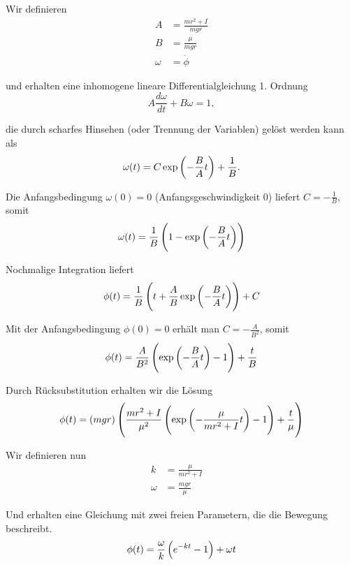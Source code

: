 \documentclass[a4paper,german,12pt,smallheadings]{scrartcl}
\begin{document}
Wir definieren
\begin{align}
  A &= \frac{mr^2+I}{mgr} \\
  B &= \frac{\mu}{mgr} \\
  \omega &= \dot{\phi}
\end{align}

und erhalten eine inhomogene lineare Differentialgleichung 1. Ordnung
\begin{equation}
  A \frac{d \omega}{dt} + B \omega = 1,
\end{equation}

die durch scharfes Hinsehen (oder Trennung der Variablen) gelöst werden kann als
\begin{equation}
  \omega(t) = C \exp\del{- \frac{B}{A} t} + \frac{1}{B}.
\end{equation}

Die Anfangsbedingung $\omega(0) = 0$ (Anfangsgeschwindigkeit 0) liefert $C =
-\frac{1}{B}$, somit
\begin{equation}
  \omega(t) = \frac{1}{B} \del{1 - \exp\del{-\frac{B}{A} t}}
\end{equation}

Nochmalige Integration liefert
\begin{equation}
  \phi(t) = \frac{1}{B} \del{t + \frac{A}{B} \exp\del{-\frac{B}{A} t}} + C
\end{equation}

Mit der Anfangsbedingung $\phi(0) = 0$ erhält man $C = -\frac{A}{B^2}$, somit
\begin{equation}
  \phi(t) = \frac{A}{B^2} \del{ \exp\del{-\frac{B}{A} t} - 1} + \frac{t}{B}
\end{equation}

Durch Rücksubstitution erhalten wir die Lösung
\begin{equation}
  \phi(t)
  = \del{mgr}
  \del{
    \frac{mr^2+I}{\mu^2}
    \del{
      \exp\del{-\frac{\mu}{mr^2 + I} t} - 1
  } + \frac{t}{\mu}}
\end{equation}

Wir definieren nun
\begin{align}
  k &= \frac{\mu}{mr^2 + I} \quad
  \label{eq:k} \\
  \omega &= \frac{mgr}{\mu}
  \label{eq:omega}
\end{align}

Und erhalten eine Gleichung mit zwei freien Parametern, die die Bewegung beschreibt.
\begin{equation}
  \phi(t) = \frac{\omega}{k} \del{e^{-kt} - 1} + \omega t
\end{equation}
\end{document}
